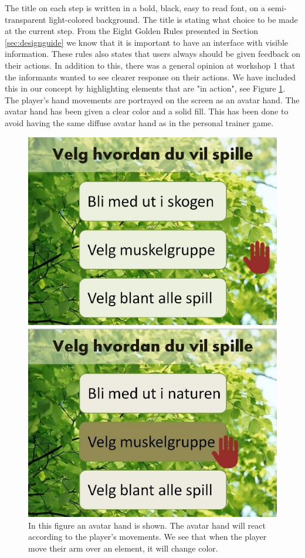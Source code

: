 The title on each step is written in a bold, black, easy to read font, on a semi-transparent light-colored background. The title is stating what choice to be made at the current step. From the Eight Golden Rules presented in Section \ref{sec:designguide} we know that it is important to have an interface with visible information. These rules also states that users always should be given feedback on their actions. In addition to this, there was a general opinion at workshop 1 that the informants wanted to see clearer response on their actions. We have included this in our concept by highlighting elements that are "in action", see Figure \ref{fig:avatarAction}. The player's hand movements are portrayed on the screen as an avatar hand. The avatar hand has been given a clear color and a solid fill. This has been done to avoid having the same diffuse avatar hand as in the personal trainer game.  

\begin{figure} [H]
\centering
\includegraphics[scale=0.5]{menuAvatarAction.jpg}
\caption[Menu - Action and response]{In this figure an avatar hand is shown. The avatar hand will react according to the player's movements. We see that when the player move their arm over an element, it will change color.}
\label{fig:avatarAction}
\end{figure} 

